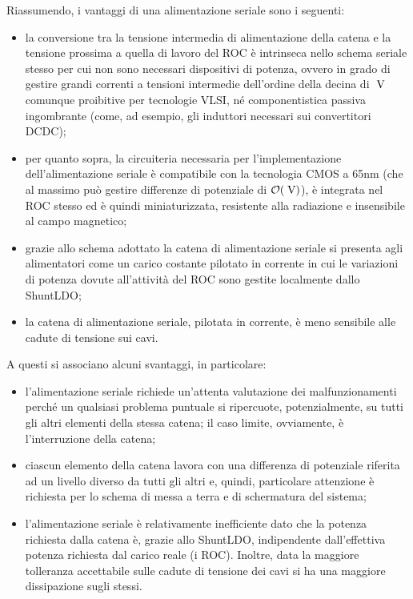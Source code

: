 Riassumendo, i vantaggi di una alimentazione seriale sono i seguenti:
\begin{itemize}
\item la conversione tra la tensione intermedia di alimentazione della catena e la tensione prossima a quella di lavoro del ROC \`e intrinseca nello schema seriale stesso per cui non sono necessari dispositivi di potenza, ovvero in grado di gestire grandi correnti a tensioni intermedie dell'ordine della decina di $\rm \; V$ comunque proibitive per tecnologie VLSI, n\'e componentistica passiva ingombrante (come, ad esempio, gli induttori necessari sui convertitori DCDC);
\item per quanto sopra, la circuiteria necessaria per l'implementazione dell'alimentazione seriale \`e compatibile con la tecnologia CMOS a 65nm (che al massimo pu\`o gestire differenze di potenziale di ${\cal O}(\rm \; V)$), \`e integrata nel ROC stesso ed \`e quindi miniaturizzata, resistente alla radiazione e insensibile al campo magnetico; 
\item grazie allo schema adottato la catena di alimentazione seriale si presenta agli alimentatori come un carico costante pilotato in corrente in cui le variazioni di potenza dovute all'attivit\`a del ROC sono gestite localmente dallo ShuntLDO;
\item la catena di alimentazione seriale, pilotata in corrente, \`e meno sensibile alle cadute di tensione sui cavi.
\end{itemize}
A questi si associano alcuni svantaggi, in particolare:
\begin{itemize}
\item l'alimentazione seriale richiede un'attenta valutazione dei malfunzionamenti perch\'e un qualsiasi problema puntuale si ripercuote, potenzialmente, su tutti gli altri elementi della stessa catena; il caso limite, ovviamente, \`e l'interruzione della catena;
\item ciascun elemento della catena lavora con una differenza di potenziale riferita ad un livello diverso da tutti gli altri e, quindi, particolare attenzione \`e richiesta per lo schema di messa a terra e di schermatura del sistema;
\item l'alimentazione seriale \`e relativamente inefficiente dato che la potenza richiesta dalla catena \`e, grazie allo ShuntLDO, indipendente dall'effettiva potenza richiesta dal carico reale (i ROC). Inoltre, data la maggiore tolleranza accettabile sulle cadute di tensione dei cavi si ha una maggiore dissipazione sugli stessi. 
\end{itemize}

